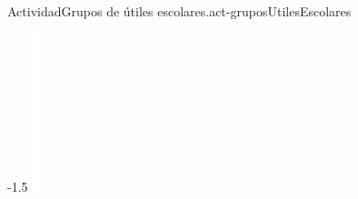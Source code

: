\documentclass[14pt]{extarticle}
\begin{document}
\begin{activity}{Actividad}{Grupos de útiles escolares.}{act-gruposUtilesEscolares}
\begin{enumerate}
\begin{enumerate}
\begin{image}{0}{1}{0}{-1.5\baselineskip}
\includegraphics[max width=\linewidth, center]{external/whitespace-tikz/3cm.pdf}

\end{image}
\end{enumerate}
\end{enumerate}
\end{activity}
\end{document}
